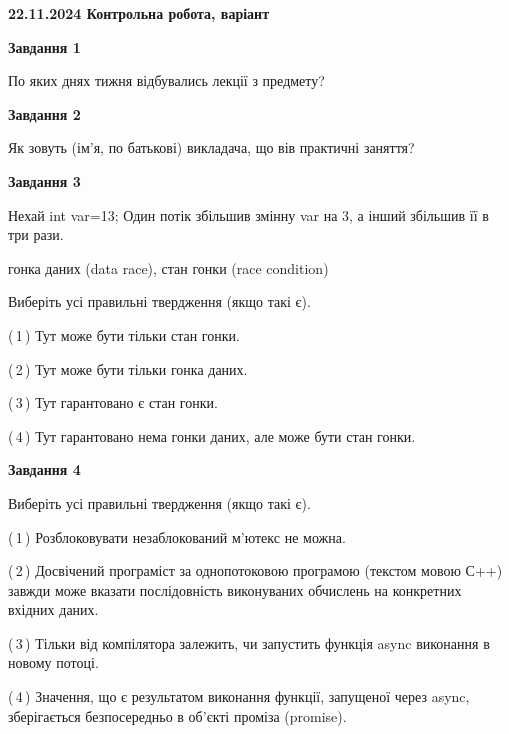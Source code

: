 \documentclass[12pt, ukrainian]{article}
\begin{document}
\begin {large}

\textbf{22.11.2024 Контрольна робота, варіант  }\par


{

\begin{center}
\textbf{Завдання 1}
\end{center}

По яких днях тижня відбувались лекції з предмету?


\begin{center}
\textbf{Завдання 2}
\end{center}

Як зовуть (ім'я, по батькові) викладача, що вів практичні заняття?


\begin{center}
\textbf{Завдання 3}
\end{center}

Нехай int var=13; Один потік збільшив змінну var на 3, а інший збільшив її в три рази.

гонка даних (data race), стан гонки (race condition)

Виберіть усі правильні твердження (якщо такі є).\par
\vspace{2mm}
(\,1\,) Тут може бути тільки стан гонки.%

(\,2\,) Тут може бути тільки гонка даних.%

(\,3\,) Тут гарантовано є стан гонки.%

(\,4\,) Тут гарантовано нема гонки даних, але може бути стан гонки.%


\begin{center}
\textbf{Завдання 4}
\end{center}

Виберіть усі правильні твердження (якщо такі є).\par
\vspace{2mm}

(\,1\,) Розблоковувати незаблокований м’ютекс не можна.%

(\,2\,) Досвічений програміст за однопотоковою програмою (текстом мовою С++) завжди може вказати послідовність виконуваних обчислень на конкретних вхідних даних.%

(\,3\,) Тільки від компілятора залежить, чи запустить функція async виконання в новому потоці.%

(\,4\,) Значення, що є результатом виконання функції, запущеної через async, зберігається безпосередньо в об’єкті проміза (promise).%


}
\end{large}
\end{document}
